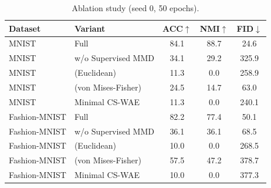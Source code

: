 \begin{table}[t]
\centering
\caption{Ablation study (seed 0, 50 epochs).}
\label{tab:ablation}
\begin{tabular}{llccc}
\toprule
Dataset & Variant & ACC$\uparrow$ & NMI$\uparrow$ & FID$\downarrow$ \\
\midrule
MNIST & Full & 84.1 & 88.7 & 24.6 \\
MNIST & w/o Supervised MMD & 34.1 & 29.2 & 325.9 \\
MNIST & (Euclidean) & 11.3 & 0.0 & 258.9 \\
MNIST & (von Mises-Fisher) & 24.5 & 14.7 & 63.0 \\
MNIST & Minimal CS-WAE & 11.3 & 0.0 & 240.1 \\
Fashion-MNIST & Full & 82.2 & 77.4 & 50.1 \\
Fashion-MNIST & w/o Supervised MMD & 36.1 & 36.1 & 68.5 \\
Fashion-MNIST & (Euclidean) & 10.0 & 0.0 & 268.5 \\
Fashion-MNIST & (von Mises-Fisher) & 57.5 & 47.2 & 378.7 \\
Fashion-MNIST & Minimal CS-WAE & 10.0 & 0.0 & 377.3 \\
\bottomrule
\end{tabular}
\end{table}